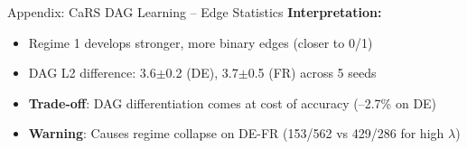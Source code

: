 \documentclass[aspectratio=169]{beamer}
\begin{document}
\begin{frame}{Appendix: CaRS DAG Learning -- Edge Statistics}
\vspace{0.4cm}
\textbf{Interpretation:}
\begin{itemize}
    \item Regime 1 develops stronger, more binary edges (closer to 0/1)
    \item DAG L2 difference: 3.6$\pm$0.2 (DE), 3.7$\pm$0.5 (FR) across 5 seeds
    \item \textbf{Trade-off}: DAG differentiation comes at cost of accuracy (--2.7\% on DE)
    \item \textbf{Warning}: Causes regime collapse on DE-FR (153/562 vs 429/286 for high $\lambda$)
\end{itemize}
\end{frame}

\end{document}
